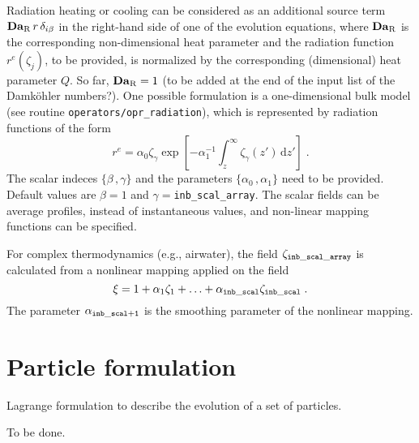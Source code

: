 Radiation heating or cooling can be considered as an additional source term $\mathrm{\bf Da}_\mathrm{R}\,r\,\delta_{i\beta}$ in the right-hand side of one of the evolution equations, where $\mathrm{\bf Da}_\mathrm{R}$ is the corresponding non-dimensional heat parameter and the radiation function $r^e(\zeta_j)$, to be provided, is normalized by the corresponding (dimensional) heat parameter $Q$. So far, $\mathrm{\bf Da}_\mathrm{R}=1$ (to be added at the end of the input list of the Damk{\"o}hler numbers?). One possible formulation is a one-dimensional bulk model (see routine {\tt operators/opr\_radiation}), which is represented by radiation functions of the form
\begin{equation}
    r^e=\alpha_0 \zeta_{\gamma}\exp\left[
    -\alpha_1^{-1}\int_z^\infty\zeta_{\gamma}(z')\,\mathrm{d}z'\right] \;.
\end{equation}
The scalar indeces $\{\beta\,,\gamma\}$ and the parameters $\{\alpha_0\,,\alpha_1\}$ need to be provided. Default values are $\beta=1$ and $\gamma=${\tt inb\_scal\_array}. The scalar fields can be average profiles, instead of instantaneous values, and non-linear mapping functions can be specified.

For complex thermodynamics (e.g., airwater), the field $\zeta_\mathrm{\tt inb\_scal\_array}$ is calculated from a nonlinear mapping applied on the field
\begin{equation}
    \xi =1+\alpha_1\zeta_1+\ldots+\alpha_\mathrm{\tt inb\_scal}\zeta_\mathrm{\tt inb\_scal}\;.
\end{equation}
The parameter $\alpha_\mathrm{\tt inb\_scal+1}$ is the smoothing parameter of the nonlinear mapping.

\section{Particle formulation}

Lagrange formulation to describe the evolution of a set of particles.

To be done.
